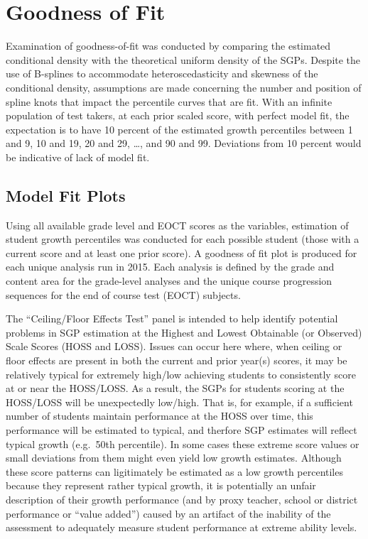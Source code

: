 \documentclass[12pt]{article}
\begin{document}
\pagebreak

\section{Goodness of Fit}\label{goodness-of-fit}

Examination of goodness-of-fit was conducted by comparing the estimated
conditional density with the theoretical uniform density of the SGPs.
Despite the use of B-splines to accommodate heteroscedasticity and
skewness of the conditional density, assumptions are made concerning the
number and position of spline knots that impact the percentile curves
that are fit. With an infinite population of test takers, at each prior
scaled score, with perfect model fit, the expectation is to have 10
percent of the estimated growth percentiles between 1 and 9, 10 and 19,
20 and 29, \ldots{}, and 90 and 99. Deviations from 10 percent would be
indicative of lack of model fit.

\subsection{Model Fit Plots}\label{model-fit-plots}

Using all available grade level and EOCT scores as the variables,
estimation of student growth percentiles was conducted for each possible
student (those with a current score and at least one prior score). A
goodness of fit plot is produced for each unique analysis run in 2015.
Each analysis is defined by the grade and content area for the
grade-level analyses and the unique course progression sequences for the
end of course test (EOCT) subjects.

The ``Ceiling/Floor Effects Test'' panel is intended to help identify
potential problems in SGP estimation at the Highest and Lowest
Obtainable (or Observed) Scale Scores (HOSS and LOSS). Issues can occur
here where, when ceiling or floor effects are present in both the
current and prior year(s) scores, it may be relatively typical for
extremely high/low achieving students to consistently score at or near
the HOSS/LOSS. As a result, the SGPs for students scoring at the
HOSS/LOSS will be unexpectedly low/high. That is, for example, if a
sufficient number of students maintain performance at the HOSS over
time, this performance will be estimated to typical, and therfore SGP
estimates will reflect typical growth (e.g.~50th percentile). In some
cases these extreme score values or small deviations from them might
even yield low growth estimates. Although these score patterns can
ligitimately be estimated as a low growth percentiles because they
represent rather typical growth, it is potentially an unfair description
of their growth performance (and by proxy teacher, school or district
performance or ``value added'') caused by an artifact of the inability
of the assessment to adequately measure student performance at extreme
ability levels.
\end{document}
